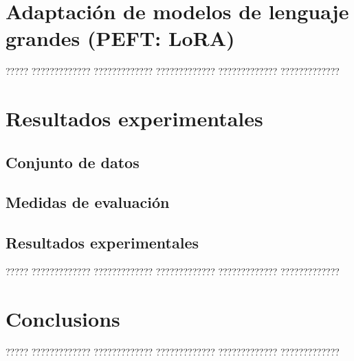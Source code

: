 \documentclass[11pt,spanish,listoffigures,listoftables]{tfgetsinf}
\begin{document}
\chapter{Adaptación de modelos de lenguaje grandes (PEFT: LoRA)}

????? ????????????? ????????????? ????????????? ????????????? ????????????? 

\chapter{Resultados experimentales}

\section{Conjunto de datos}

\section{Medidas de evaluación}

\section{Resultados experimentales}

????? ????????????? ????????????? ????????????? ????????????? ?????????????


\chapter{Conclusions}

????? ????????????? ????????????? ????????????? ????????????? ????????????? 


\end{document}
